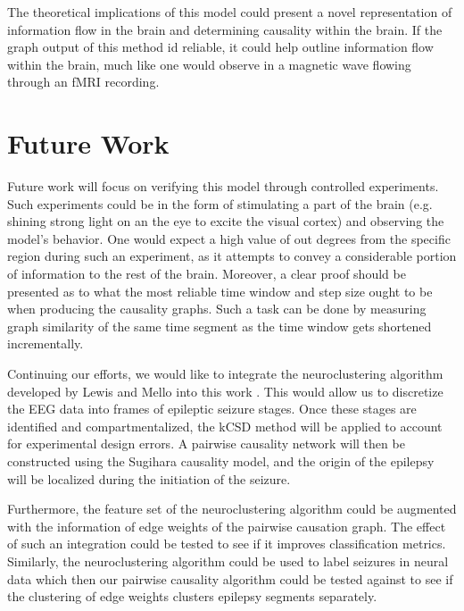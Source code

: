 \documentclass[journal,12pt,onecolumn,draftclsnofoot]{IEEEtran}  %
\begin{document}
The theoretical implications of this model could present a novel representation of information flow in the brain and determining causality within the brain. If the graph output of this method id reliable, it could help outline information flow within the brain, much like one would observe in a magnetic wave flowing through an fMRI recording. 



\section{Future Work}

Future work will focus on verifying this model through controlled experiments. Such experiments could be in the form of stimulating a part of the brain (e.g. shining strong light on an the eye to excite the visual cortex) and observing the model's behavior. One would expect a high value of out degrees from the specific region during such an experiment, as it attempts to convey a considerable portion of information to the rest of the brain. Moreover, a clear proof should be presented as to what the most reliable time window and step size ought to be when producing the causality graphs. Such a task can be done by measuring graph similarity of the same time segment as the time window gets shortened incrementally.

Continuing our efforts, we would like to integrate the neuroclustering algorithm developed by Lewis and Mello into this work \cite{Lewis2012}. This would allow us to discretize the EEG data into frames of epileptic seizure stages. Once these stages are identified and compartmentalized, the kCSD method will be applied to account for experimental design errors. A pairwise causality network will then be constructed using the Sugihara causality model, and the origin of the epilepsy will be localized during the initiation of the seizure.

Furthermore, the feature set of the neuroclustering algorithm could be augmented with the information of edge weights of the pairwise causation graph. The effect of such an integration could be tested to see if it improves classification metrics. Similarly, the neuroclustering algorithm could be used to label seizures in neural data which then our pairwise causality algorithm could be tested against to see if the clustering of edge weights clusters epilepsy segments separately.
\end{document}
